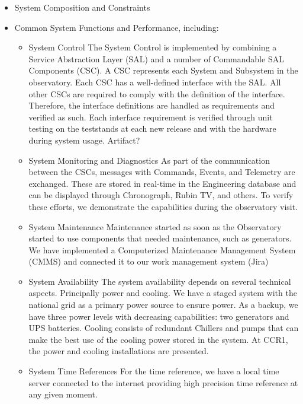 \begin{itemize}
\item System Composition and Constraints

\item Common System Functions and Performance, including:

	\begin{itemize}
		\item System Control
		The System Control is implemented by combining a Service Abstraction Layer (SAL) and a number of Commandable SAL Components (CSC).
		A CSC represents each System and Subsystem in the observatory.
		Each CSC has a well-defined interface with the SAL. All other CSCs are required to comply with the definition of the interface.
		Therefore, the interface definitions are handled as requirements and verified as such. 
		Each interface requirement is verified through unit testing on the teststands at each new release and with the hardware during system usage.  
		Artifact?
		
		\item System Monitoring and Diagnostics
		As part of the communication between the CSCs, messages with Commands, Events, and Telemetry are exchanged. 
		These are stored in real-time in the Engineering database and can be displayed through Chronograph, Rubin TV, and others.
		To verify these efforts, we demonstrate the capabilities during the observatory visit. 
				
		\item System Maintenance
		Maintenance started as soon as the Observatory started to use components that needed maintenance, such as generators.
		We have implemented a Computerized Maintenance Management System (CMMS) and connected it to our work management system (Jira) 
		
		\item System Availability
		The system availability depends on several technical aspects. Principally power and cooling. 
		We have a staged system with the national grid as a primary power source to ensure power. 
		As a backup, we have three power levels with decreasing capabilities: two generators and UPS batteries.
		Cooling consists of redundant Chillers and pumps that can make the best use of the cooling power stored in the system.
		At CCR1, the power and cooling installations are presented. 
		
		\item System Time References
		For the time reference, we have a local time server connected to the internet providing high precision time reference at any given moment.  		
		

\end{itemize}
\end{itemize}
